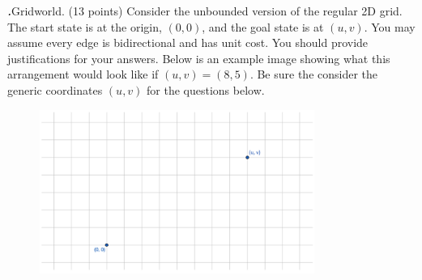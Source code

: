 \documentclass[12pt]{amsart}
\newenvironment{statement}[1]{\smallskip\noindent\color[rgb]{0.0,0.0,0.0} {\bf #1.}}{}
\theoremstyle{definition}
\theoremstyle{remark}
\newcommand{\1}{\mathds{1}}
\begin{document}
\newpage
\begin{statement}{2} 
\emph{Gridworld.} (13 points) Consider the unbounded version of the regular 2D grid. The start state is at the origin, $(0,0)$, and the goal state is at $(u, v)$. You may assume every edge is bidirectional and has unit cost. You should provide justifications for your answers. Below is an example image showing what this arrangement would look like if $(u, v) = (8,5)$. Be sure the consider the generic coordinates $(u, v)$ for the questions below.
\begin{figure}[H]
    \centering
    \includegraphics[width=0.8\textwidth]{images/2d_grid_new.png}
\end{figure}


\end{statement}
\end{document}
